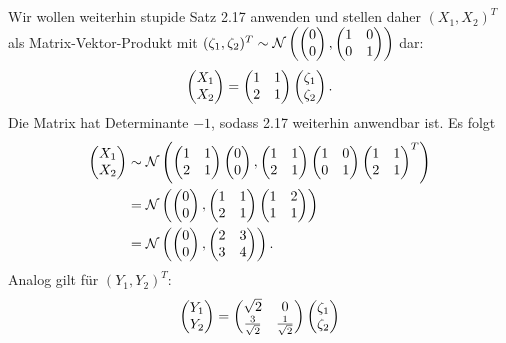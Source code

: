 \documentclass[a4paper]{article}
\begin{document}
\subsection{}


\subsection{}

\subsection{}

Wir wollen weiterhin stupide Satz 2.17 anwenden und stellen daher $(X_1, X_2)^T$ als Matrix-Vektor-Produkt mit $(\zeta_1, \zeta_2)^T \sim \mathcal{N}\left(\left(\begin{matrix}0 \\ 0\end{matrix}\right), \left(\begin{matrix}1 & 0 \\ 0 & 1\end{matrix}\right)\right)$ dar:
\begin{equation*}
    \left(\begin{matrix}X_1 \\ X_2\end{matrix}\right) = \left(\begin{matrix}1 & 1 \\ 2 & 1\end{matrix}\right) \left(\begin{matrix}\zeta_1\\ \zeta_2\end{matrix}\right)\text{.}
\end{equation*}
Die Matrix hat Determinante $-1$, sodass 2.17 weiterhin anwendbar ist. Es folgt
\begin{align*}
    \left(\begin{matrix}X_1 \\ X_2\end{matrix}\right) &\sim \mathcal{N} \left( \left(\begin{matrix}1 & 1 \\ 2 & 1\end{matrix}\right) \left(\begin{matrix}0 \\ 0\end{matrix}\right), \left(\begin{matrix}1 & 1 \\ 2 & 1\end{matrix}\right) \left(\begin{matrix}1 & 0 \\ 0 & 1\end{matrix}\right) \left(\begin{matrix}1 & 1 \\ 2 & 1\end{matrix}\right)^T \right)\\
    &= \mathcal{N} \left( \left(\begin{matrix}0 \\ 0\end{matrix}\right), \left(\begin{matrix}1 & 1 \\ 2 & 1\end{matrix}\right) \left(\begin{matrix}1 & 2 \\ 1 & 1\end{matrix}\right) \right)\\
    &= \mathcal{N} \left( \left(\begin{matrix}0 \\ 0\end{matrix}\right), \left(\begin{matrix}2 & 3 \\ 3 & 4\end{matrix}\right) \right)\text{.}
\end{align*}
Analog gilt für $(Y_1, Y_2)^T$:
\begin{equation*}
    \left(\begin{matrix}Y_1 \\ Y_2\end{matrix}\right) = \left(\begin{matrix}\sqrt{2} & 0 \\ \frac{3}{\sqrt{2}} & \frac{1}{\sqrt{2}}\end{matrix}\right) \left(\begin{matrix}\zeta_1 \\ \zeta_2\end{matrix}\right)
\end{equation*}
\end{document}
